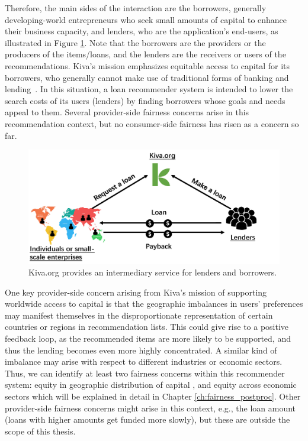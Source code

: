         Therefore, the main sides of the interaction are the borrowers, generally developing-world entrepreneurs who seek small amounts of capital to enhance their business capacity, and lenders, who are the application's end-users, as illustrated in Figure \ref{fig:kiva_process}. Note that the borrowers are the providers or the producers of the items/loans, and the lenders are the receivers or users of the recommendations. Kiva's mission emphasizes equitable access to capital for its borrowers, who generally cannot make use of traditional forms of banking and lending~\cite{Choo_understanding_kiva}. In this situation, a loan recommender system is intended to lower the search costs of its users (lenders) by finding borrowers whose goals and needs appeal to them. Several provider-side fairness concerns arise in this recommendation context, but no consumer-side fairness has risen as a concern so far.
        
        \begin{figure}[htb]
        \includegraphics[width=0.98\columnwidth]{imgs/far/microlending.png}
        \caption{Kiva.org provides an intermediary service for lenders and borrowers.}
        \label{fig:kiva_process}
        \end{figure}
        
        
        One key provider-side concern arising from Kiva's mission of supporting worldwide access to capital is that the geographic imbalances in users' preferences may manifest themselves in the disproportionate representation of certain countries or regions in recommendation lists. This could give rise to a positive feedback loop, as the recommended items are more likely to be supported, and thus the lending becomes even more highly concentrated. A similar kind of imbalance may arise with respect to different industries or economic sectors. Thus, we can identify at least two fairness concerns within this recommender system: equity in geographic distribution of capital \cite{liu2019personalized}, and equity across economic sectors \cite{sonboli2020opportunistic} which will be explained in detail in Chapter \ref{ch:fairness_postproc}. Other provider-side fairness concerns might arise in this context, e.g., the loan amount (loans with higher amounts get funded more slowly), but these are outside the scope of this thesis.
        
